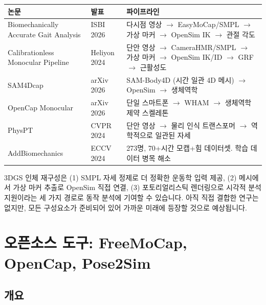 \documentclass[11pt, a4paper]{report}
\begin{document}
\begin{center}
\renewcommand{\arraystretch}{1.3}
\small
\begin{tabular}{p{3cm}p{2.5cm}p{7cm}}
\toprule
\textbf{논문} & \textbf{발표} & \textbf{파이프라인} \\
\midrule
Biomechanically Accurate Gait Analysis & ISBI 2026 & 다시점 영상 $\rightarrow$ EasyMoCap/SMPL $\rightarrow$ 가상 마커 $\rightarrow$ OpenSim IK $\rightarrow$ 관절 각도 \\
\addlinespace
Calibrationless Monocular Pipeline & Heliyon 2024 & 단안 영상 $\rightarrow$ CameraHMR/SMPL $\rightarrow$ 가상 마커 $\rightarrow$ OpenSim IK/ID $\rightarrow$ GRF $\rightarrow$ 근활성도 \\
\addlinespace
SAM4Dcap & arXiv 2026 & SAM-Body4D (시간 일관 4D 메시) $\rightarrow$ OpenSim $\rightarrow$ 생체역학 \\
\addlinespace
OpenCap Monocular & arXiv 2026 & 단일 스마트폰 $\rightarrow$ WHAM $\rightarrow$ 생체역학 제약 스켈레톤 \\
\addlinespace
PhysPT & CVPR 2024 & 단안 영상 $\rightarrow$ 물리 인식 트랜스포머 $\rightarrow$ 역학적으로 일관된 자세 \\
\addlinespace
AddBiomechanics & ECCV 2024 & 273명, 70+시간 모캡+힘 데이터셋. 학습 데이터 병목 해소 \\
\bottomrule
\end{tabular}
\end{center}

\begin{summary}
3DGS 인체 재구성은 (1) SMPL 자세 정제로 더 정확한 운동학 입력 제공, (2) 메시에서 가상 마커 추출로 OpenSim 직접 연결, (3) 포토리얼리스틱 렌더링으로 시각적 분석 지원이라는 세 가지 경로로 동작 분석에 기여할 수 있습니다. 아직 직접 결합한 연구는 없지만, 모든 구성요소가 준비되어 있어 가까운 미래에 등장할 것으로 예상됩니다.
\end{summary}


\chapter{오픈소스 도구: FreeMoCap, OpenCap, Pose2Sim}
\label{ch:tools}

\section{개요}
\end{document}
